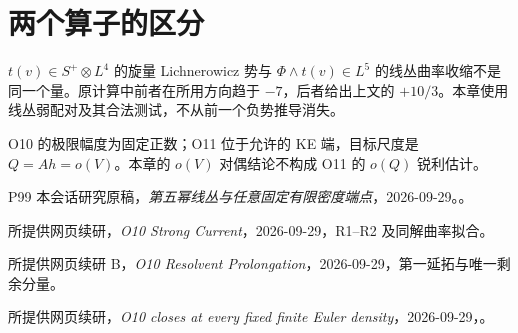 \documentclass[UTF8,11pt,fontset=none]{ctexart}
\begin{document}
\section{两个算子的区分}\label{ch3:ux4e24ux4e2aux7b97ux5b50ux7684ux533aux5206}

\(t(v)\in S^+\otimes L^4\) 的旋量 Lichnerowicz 势与 \(\Phi\wedge t(v)\in L^5\) 的线丛曲率收缩不是同一个量。原计算中前者在所用方向趋于 \(-7\)，后者给出上文的 \(+10/3\)。本章使用线丛弱配对及其合法测试，不从前一个负势推导消失。

O10 的极限幅度为固定正数；O11 位于允许的 KE 端，目标尺度是 \(Q=Ah=o(V)\)。本章的 \(o(V)\) 对偶结论不构成 O11 的 \(o(Q)\) 锐利估计。

\begin{thebibliography}{P99}
\small
{} 本会话研究原稿，\emph{第五幂线丛与任意固定有限密度端点}，2026-09-29。。

 所提供网页续研，\emph{O10 Strong Current}，2026-09-29，R1--R2 及同解曲率拟合。

 所提供网页续研 B，\emph{O10 Resolvent Prolongation}，2026-09-29，第一延拓与唯一剩余分量。

 所提供网页续研，\emph{O10 closes at every fixed finite Euler density}，2026-09-29，。

\end{thebibliography}
\end{document}
